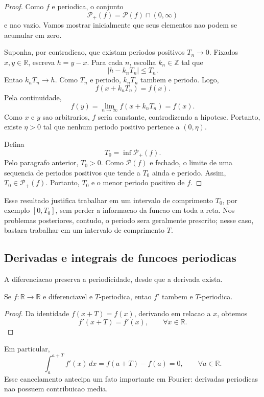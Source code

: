 \begin{proof}
Como \(f\) e periodica, o conjunto
\[
\mathcal{P}_+(f)=\mathcal{P}(f)\cap(0,\infty)
\]
e nao vazio. Vamos mostrar inicialmente que seus elementos nao podem se
acumular em zero.

Suponha, por contradicao, que existam periodos positivos \(T_n\to0\). Fixados
\(x,y\in\mathbb{R}\), escreva \(h=y-x\). Para cada \(n\), escolha
\(k_n\in\mathbb{Z}\) tal que
\[
|h-k_nT_n|\le T_n.
\]
Entao \(k_nT_n\to h\). Como \(T_n\) e periodo, \(k_nT_n\) tambem e periodo.
Logo,
\[
f(x+k_nT_n)=f(x).
\]
Pela continuidade,
\[
f(y)=\lim_{n\to\infty}f(x+k_nT_n)=f(x).
\]
Como \(x\) e \(y\) sao arbitrarios, \(f\) seria constante, contradizendo a
hipotese. Portanto, existe \(\eta>0\) tal que nenhum periodo positivo pertence
a \((0,\eta)\).

Defina
\[
T_0=\inf\mathcal{P}_+(f).
\]
Pelo paragrafo anterior, \(T_0>0\). Como \(\mathcal{P}(f)\) e fechado, o limite
de uma sequencia de periodos positivos que tende a \(T_0\) ainda e periodo.
Assim, \(T_0\in\mathcal{P}_+(f)\). Portanto, \(T_0\) e o menor periodo positivo
de \(f\).
\end{proof}

Esse resultado justifica trabalhar em um intervalo de comprimento \(T_0\), por
exemplo \([0,T_0]\), sem perder a informacao da funcao em toda a reta. Nos
problemas posteriores, contudo, o periodo sera geralmente prescrito; nesse
caso, bastara trabalhar em um intervalo de comprimento \(T\).

\subsection{Derivadas e integrais de funcoes periodicas}

A diferenciacao preserva a periodicidade, desde que a derivada exista.

\begin{proposicao}
Se \(f:\mathbb{R}\to\mathbb{R}\) e diferenciavel e \(T\)-periodica, entao
\(f'\) tambem e \(T\)-periodica.
\end{proposicao}

\begin{proof}
Da identidade \(f(x+T)=f(x)\), derivando em relacao a \(x\), obtemos
\[
f'(x+T)=f'(x), \qquad \forall x\in\mathbb{R}.
\]
\end{proof}

Em particular,
\[
\int_a^{a+T}f'(x)\,dx=f(a+T)-f(a)=0,
\qquad \forall a\in\mathbb{R}.
\]
Esse cancelamento antecipa um fato importante em Fourier: derivadas periodicas
nao possuem contribuicao media.

